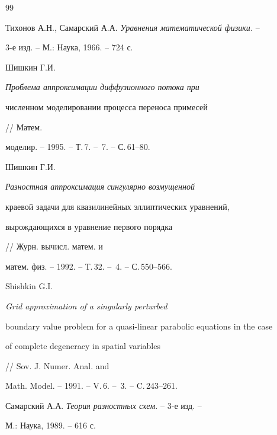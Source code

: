 \begin{thebibliography}{99}


Тихонов А.Н., Самарский А.А. {\em Уравнения математической физики.} --


3-е изд. -- М.: Наука, 1966. -- 724 с.







Шишкин Г.И. {\em Проблема аппроксимации диффузионного потока при


численном моделировании процесса переноса примесей} // Матем.


моделир. -- 1995. -- Т.\,7. -- \No\,7. -- С.\,61--80.







Шишкин Г.И. {\em Разностная аппроксимация сингулярно возмущенной 


краевой задачи для квазилинейных эллиптических уравнений, 


вырождающихся в уравнение первого порядка} // Журн. вычисл. матем. и 


матем. физ. -- 1992. -- Т.\,32. -- \No\,4. -- С.\,550--566.







Shishkin G.I. {\em Grid approximation of a singularly perturbed 


boundary value problem for a quasi-linear parabolic equations in the case 


of complete degeneracy in spatial variables} // Sov. J. Numer. Anal. and


Math. Model. -- 1991. -- V.\,6. -- \No\,3. -- C.\,243--261.







Самарский А.А. {\em Теория разностных схем.} -- 3-е изд. -- 


М.: Наука, 1989. -- 616 с.





\end{thebibliography}





\vskip 2cm




















